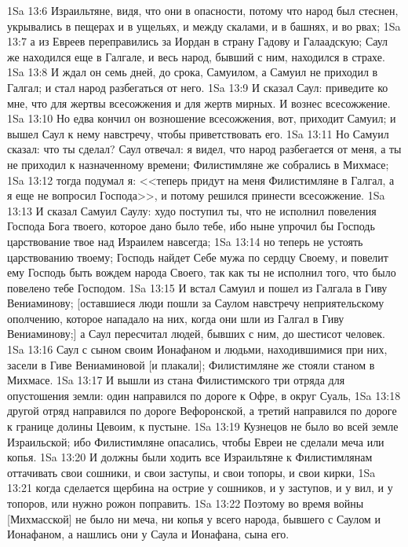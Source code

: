 \vs 1Sa 13:6 Израильтяне, видя, что они в опасности, потому что народ был стеснен, укрывались в пещерах и в ущельях, и между скалами, и в башнях, и во рвах;
\vs 1Sa 13:7 а  из Евреев переправились за Иордан в страну Гадову и Галаадскую; Саул же находился еще в Галгале, и весь народ, бывший с ним, находился в страхе.
\vs 1Sa 13:8 И ждал он семь дней, до срока,  Самуилом, а Самуил не приходил в Галгал; и стал народ разбегаться от него.
\vs 1Sa 13:9 И сказал Саул: приведите ко мне, что  для жертвы всесожжения и для жертв мирных. И вознес всесожжение.
\vs 1Sa 13:10 Но едва кончил он возношение всесожжения, вот, приходит Самуил; и вышел Саул к нему навстречу, чтобы приветствовать его.
\vs 1Sa 13:11 Но Самуил сказал: что ты сделал? Саул отвечал: я видел, что народ разбегается от меня, а ты не приходил к назначенному времени; Филистимляне же собрались в Михмасе;
\vs 1Sa 13:12 тогда подумал я: <<теперь придут на меня Филистимляне в Галгал, а я еще не вопросил Господа>>, и потому решился принести всесожжение.
\vs 1Sa 13:13 И сказал Самуил Саулу: худо поступил ты, что не исполнил повеления Господа Бога твоего, которое дано было тебе, ибо ныне упрочил бы Господь царствование твое над Израилем навсегда;
\vs 1Sa 13:14 но теперь не устоять царствованию твоему; Господь найдет Себе мужа по сердцу Своему, и повелит ему Господь быть вождем народа Своего, так как ты не исполнил того, что было повелено тебе Господом.
\vs 1Sa 13:15 И встал Самуил и пошел из Галгала в Гиву Вениаминову; [оставшиеся люди пошли за Саулом навстречу неприятельскому ополчению, которое нападало на них, когда они шли из Галгал в Гиву Вениаминову;] а Саул пересчитал людей, бывших с ним, до шестисот человек.
\vs 1Sa 13:16 Саул с сыном своим Ионафаном и людьми, находившимися при них, засели в Гиве Вениаминовой [и плакали]; Филистимляне же стояли станом в Михмасе.
\vs 1Sa 13:17 И вышли из стана Филистимского три отряда для опустошения земли: один направился по дороге к Офре, в округ Суаль,
\vs 1Sa 13:18 другой отряд направился по дороге Вефоронской, а третий направился по дороге к границе долины Цевоим, к пустыне.
\vs 1Sa 13:19 Кузнецов не было во всей земле Израильской; ибо Филистимляне опасались, чтобы Евреи не сделали меча или копья.
\vs 1Sa 13:20 И должны были ходить все Израильтяне к Филистимлянам оттачивать свои сошники, и свои заступы, и свои топоры, и свои кирки,
\vs 1Sa 13:21 когда сделается щербина на острие у сошников, и у заступов, и у вил, и у топоров, или нужно рожон поправить.
\vs 1Sa 13:22 Поэтому во время войны [Михмасской] не было ни меча, ни копья у всего народа, бывшего с Саулом и Ионафаном, а  нашлись они у Саула и Ионафана, сына его.
